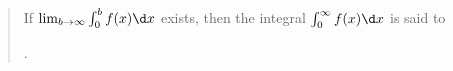 \documentclass{ximera}
\author{Gregory Hartman \and Matthew Carr}
\begin{document}
\begin{exercise}



\begin{quote}

If $\lim_{b\to\infty}\int_{0}^{b}f(x)\d x$ exists, then the integral $\int_{0}^{\infty}f(x)\d x$ is said to \begin{prompt}\end{prompt}.

\end{quote}

\end{exercise}
\end{document}

